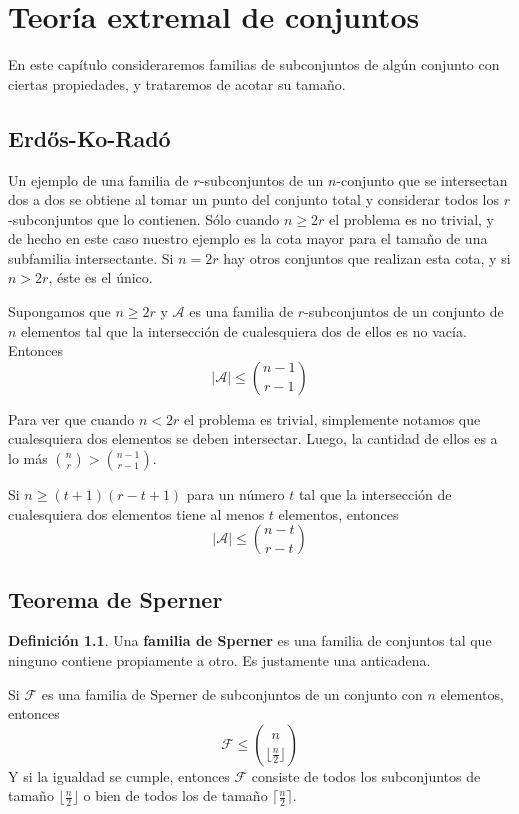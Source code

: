 \documentclass[spanish]{book}
\theoremstyle{definition}
\newtheorem*{defn}{Definición}
\begin{document}
\chapter{Teoría extremal de conjuntos}
En este capítulo consideraremos familias de subconjuntos de algún conjunto con ciertas propiedades, y trataremos de acotar su tamaño.

\section{Erdős-Ko-Radó}
Un ejemplo de una familia de $r$-subconjuntos de un $n$-conjunto que se intersectan dos a dos se obtiene al tomar un punto del conjunto total y considerar todos los $r$-subconjuntos que lo contienen. Sólo cuando $n\geq2r$ el problema es no trivial, y de hecho en este caso nuestro ejemplo es la cota mayor para el tamaño de una subfamilia intersectante. Si $n=2r$ hay otros conjuntos que realizan esta cota, y si $n>2r$, éste es el único.
\begin{teo}
	Supongamos que $n\geq 2r$ y $\mathcal{A}$ es una familia de $r$-subconjuntos de un conjunto de $n$ elementos tal que la intersección de cualesquiera dos de ellos es no vacía. Entonces
	\[|\mathcal{A}|\leq{n-1\choose r-1}\]
\end{teo}
Para ver que cuando $n<2r$ el problema es trivial, simplemente notamos que cualesquiera dos elementos se deben intersectar. Luego, la cantidad de ellos es a lo más ${n\choose r}>{n-1\choose r-1}$.
\begin{teo}
	Si $n\geq(t+1)(r-t+1)$ para un número $t$ tal que la intersección de cualesquiera dos elementos tiene al menos $t$ elementos, entonces
	\[|\mathcal{A}|\leq{n-t\choose r-t}\]
\end{teo}
\section{Teorema de Sperner}
\begin{defn}
	Una \textbf{familia de Sperner} es una familia de conjuntos tal que ninguno contiene propiamente a otro. Es justamente una anticadena.
\end{defn}
\begin{teo}[de Sperner]
	Si $\mathcal{F}$ es una familia de Sperner de subconjuntos de un conjunto con $n$ elementos, entonces
	\[\mathcal{F}\leq{n\choose\lfloor\frac{n}{2}\rfloor}\]
	Y si la igualdad se cumple, entonces $\mathcal{F}$ consiste de todos los subconjuntos de tamaño $\lfloor\frac{n}{2}\rfloor$ o bien de todos los de tamaño $\lceil\frac{n}{2}\rceil$.
\end{teo}
\end{document}
